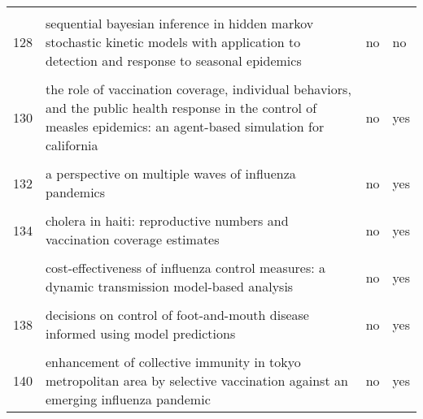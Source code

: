 \documentclass[
]{article}
\begin{document}
\begin{landscape}
\begin{longtable}{l>{\raggedright\arraybackslash}p{4cm}l>{\raggedright\arraybackslash}p{4cm}}
\cellcolor{gray!6}{127} & \cellcolor{gray!6}{modeling the influence of environment and intervention oncholera in haiti} & \cellcolor{gray!6}{no} & \cellcolor{gray!6}{yes}\\
128 & sequential bayesian inference in hidden markov stochastic kinetic models with application to detection and response to seasonal epidemics & no & no\\
\cellcolor{gray!6}{129} & \cellcolor{gray!6}{simulating optimal vaccination times during cholera outbreaks} & \cellcolor{gray!6}{no} & \cellcolor{gray!6}{yes}\\
130 & the role of vaccination coverage, individual behaviors, and the public health response in the control of measles epidemics: an agent-based simulation for california & no & yes\\
\addlinespace
\cellcolor{gray!6}{131} & \cellcolor{gray!6}{time is (still) of the essence: quantifying the impact of emergency meningitis vaccination response in katsina state, nigeria} & \cellcolor{gray!6}{no} & \cellcolor{gray!6}{yes}\\
132 & a perspective on multiple waves of influenza pandemics & no & yes\\
\cellcolor{gray!6}{133} & \cellcolor{gray!6}{an optimal control problem arising from a dengue disease transmission model} & \cellcolor{gray!6}{no} & \cellcolor{gray!6}{no}\\
134 & cholera in haiti: reproductive numbers and vaccination coverage estimates & no & yes\\
\cellcolor{gray!6}{135} & \cellcolor{gray!6}{comparing control strategies against foot-and-mouth disease: will vaccination be cost-effective in denmark?} & \cellcolor{gray!6}{no} & \cellcolor{gray!6}{yes}\\
\addlinespace
136 & cost-effectiveness of influenza control measures: a dynamic transmission model-based analysis & no & yes\\
\cellcolor{gray!6}{137} & \cellcolor{gray!6}{cost-effectiveness of workplace closure and travel restriction for mitigating influenza outbreaks: a network-based simulation} & \cellcolor{gray!6}{no} & \cellcolor{gray!6}{no}\\
138 & decisions on control of foot-and-mouth disease informed using model predictions & no & yes\\
\cellcolor{gray!6}{139} & \cellcolor{gray!6}{dengue in cape verde: vector control and vaccination} & \cellcolor{gray!6}{no} & \cellcolor{gray!6}{yes}\\
140 & enhancement of collective immunity in tokyo metropolitan area by selective vaccination against an emerging influenza pandemic & no & yes\\

\end{longtable}
\end{landscape}
\end{document}

